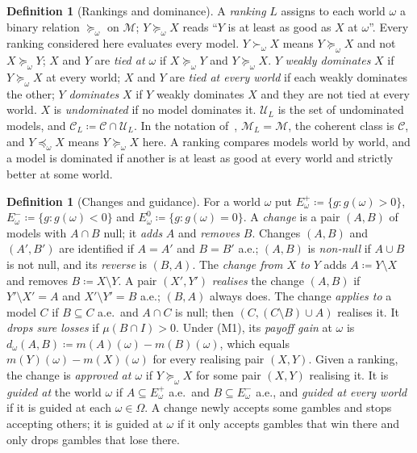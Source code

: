 \documentclass[11pt]{article}
\theoremstyle{definition}
\newtheorem{definition}[theorem]{Definition}
\newcommand{\M}{\mathcal M}
\newcommand{\C}{\mathcal C}
\newcommand{\U}{\mathcal U}
\newcommand{\Ep}{E^{+}}
\newcommand{\Em}{E^{-}}
\newcommand{\Ez}{E^{0}}
\begin{document}
\begin{definition}[Rankings and dominance]\label{def:rankings}
A \emph{ranking} $L$ assigns to each world $\omega$ a binary relation $\succeq_\omega$ on $\M$; $Y\succeq_\omega X$ reads ``$Y$ is at least as good as $X$ at $\omega$''. Every ranking considered here evaluates every model. $Y\succ_\omega X$ means $Y\succeq_\omega X$ and not $X\succeq_\omega Y$; $X$ and $Y$ are \emph{tied at $\omega$} if $X\succeq_\omega Y$ and $Y\succeq_\omega X$. $Y$ \emph{weakly dominates} $X$ if $Y\succeq_\omega X$ at every world; $X$ and $Y$ are \emph{tied at every world} if each weakly dominates the other; $Y$ \emph{dominates} $X$ if $Y$ weakly dominates $X$ and they are not tied at every world. $X$ is \emph{undominated} if no model dominates it. $\U_L$ is the set of undominated models, and $\C_L\coloneqq\C\cap\U_L$. In the notation of~\cite{LDG}, $\M_L=\M$, the coherent class is $\C$, and $Y\preceq_\omega X$ means $Y\succeq_\omega X$ here. {\color{red}A ranking compares models world by world, and a model is dominated if another is at least as good at every world and strictly better at some world.}
\end{definition}

\begin{definition}[Changes and guidance]\label{def:change}
{\color{red}For a world $\omega$ put $\Ep_\omega\coloneqq\{g:g(\omega)>0\}$, $\Em_\omega\coloneqq\{g:g(\omega)<0\}$ and $\Ez_\omega\coloneqq\{g:g(\omega)=0\}$. A \emph{change} is a pair $(A,B)$ of models with $A\cap B$ null; it \emph{adds} $A$ and \emph{removes} $B$. Changes $(A,B)$ and $(A',B')$ are identified if $A=A'$ and $B=B'$ a.e.; $(A,B)$ is \emph{non-null} if $A\cup B$ is not null, and its \emph{reverse} is $(B,A)$.} The \emph{change from $X$ to $Y$} adds $A\coloneqq Y\setminus X$ and removes $B\coloneqq X\setminus Y$. {\color{red}A pair $(X',Y')$ \emph{realises} the change $(A,B)$ if $Y'\setminus X'=A$ and $X'\setminus Y'=B$ a.e.; $(B,A)$ always does. The change \emph{applies to} a model $C$ if $B\subseteq C$ a.e.\ and $A\cap C$ is null; then $(C,(C\setminus B)\cup A)$ realises it. It \emph{drops sure losses} if $\mu(B\cap I)>0$. Under (M1), its \emph{payoff gain} at $\omega$ is $d_\omega(A,B)\coloneqq m(A)(\omega)-m(B)(\omega)$, which equals $m(Y)(\omega)-m(X)(\omega)$ for every realising pair $(X,Y)$. Given a ranking, the change is \emph{approved at $\omega$} if $Y\succeq_\omega X$ for some pair $(X,Y)$ realising it.} It is \emph{guided at} the world $\omega$ if $A\subseteq\Ep_\omega$ a.e.\ and $B\subseteq\Em_\omega$ a.e., and \emph{guided at every world} if it is guided at each $\omega\in\Omega$. {\color{red}A change newly accepts some gambles and stops accepting others; it is guided at $\omega$ if it only accepts gambles that win there and only drops gambles that lose there.}
\end{definition}
\end{document}
